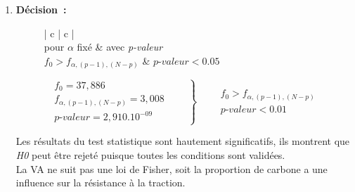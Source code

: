 \begin{enumerate}
    \item \textbf{Décision~:}
        \begin{figure}[!h]
            \centering
            \begin{minipage}{.40\linewidth}
                \begin{center}
                    \begin{tabular}{| c | c |}
                        \hline
                         \\
                        pour $\alpha$ fixé & avec \textit{p-valeur} \\ \hline
                        $f_{0} > f_{\alpha, (p-1), (N-p)}$ & $ \textit{p-valeur} < 0.05 $\\ \hline
                    \end{tabular}
                \end{center}
            \end{minipage}\hfill\vline
            \begin{minipage}{.56\linewidth}
                \begin{equation*}
                    \left .
                    \begin{aligned}
                        f_{0} = 37,886 \\
                        f_{\alpha, (p-1), (N-p)} = 3,008\\
                        \textit{p-valeur} = 2,910.10^{-09}
                    \end{aligned} \qquad
                    \right\} \qquad
                    \begin{aligned} 
                        f_{0} > f_{\alpha, (p-1), (N-p)}\\
                        \textit{p-valeur} < 0.01
                    \end{aligned}
                \end{equation*}
            \end{minipage}
        \end{figure}

        Les résultats du test statistique sont hautement significatifs, ils montrent que \textit{H0} peut être rejeté puisque toutes les conditions sont validées. \\
        La VA ne suit pas une loi de Fisher, soit la proportion de carbone a une influence sur la résistance à la traction.
\end{enumerate}

